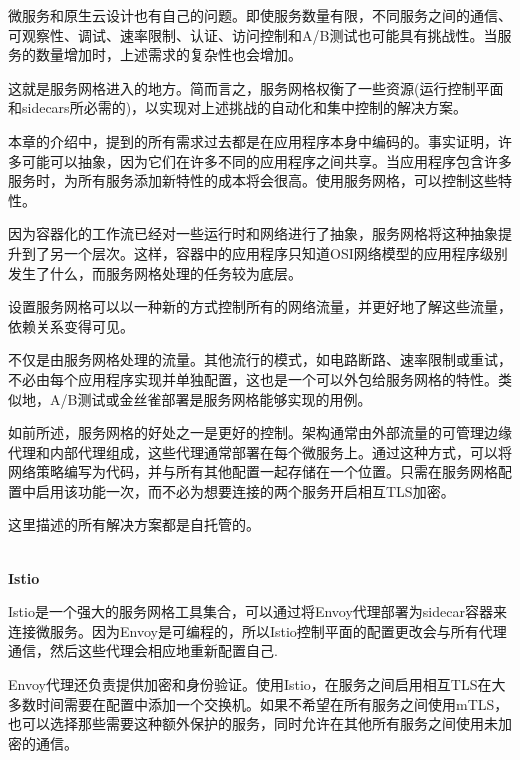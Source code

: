 
微服务和原生云设计也有自己的问题。即使服务数量有限，不同服务之间的通信、可观察性、调试、速率限制、认证、访问控制和A/B测试也可能具有挑战性。当服务的数量增加时，上述需求的复杂性也会增加。

这就是服务网格进入的地方。简而言之，服务网格权衡了一些资源(运行控制平面和sidecars所必需的)，以实现对上述挑战的自动化和集中控制的解决方案。


本章的介绍中，提到的所有需求过去都是在应用程序本身中编码的。事实证明，许多可能可以抽象，因为它们在许多不同的应用程序之间共享。当应用程序包含许多服务时，为所有服务添加新特性的成本将会很高。使用服务网格，可以控制这些特性。

因为容器化的工作流已经对一些运行时和网络进行了抽象，服务网格将这种抽象提升到了另一个层次。这样，容器中的应用程序只知道OSI网络模型的应用程序级别发生了什么，而服务网格处理的任务较为底层。

设置服务网格可以以一种新的方式控制所有的网络流量，并更好地了解这些流量，依赖关系变得可见。

不仅是由服务网格处理的流量。其他流行的模式，如电路断路、速率限制或重试，不必由每个应用程序实现并单独配置，这也是一个可以外包给服务网格的特性。类似地，A/B测试或金丝雀部署是服务网格能够实现的用例。

如前所述，服务网格的好处之一是更好的控制。架构通常由外部流量的可管理边缘代理和内部代理组成，这些代理通常部署在每个微服务上。通过这种方式，可以将网络策略编写为代码，并与所有其他配置一起存储在一个位置。只需在服务网格配置中启用该功能一次，而不必为想要连接的两个服务开启相互TLS加密。


这里描述的所有解决方案都是自托管的。

\hspace*{\fill} \\ %
\noindent
\textbf{Istio}

Istio是一个强大的服务网格工具集合，可以通过将Envoy代理部署为sidecar容器来连接微服务。因为Envoy是可编程的，所以Istio控制平面的配置更改会与所有代理通信，然后这些代理会相应地重新配置自己.

Envoy代理还负责提供加密和身份验证。使用Istio，在服务之间启用相互TLS在大多数时间需要在配置中添加一个交换机。如果不希望在所有服务之间使用mTLS，也可以选择那些需要这种额外保护的服务，同时允许在其他所有服务之间使用未加密的通信。

